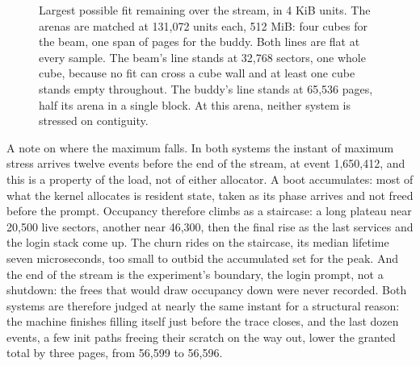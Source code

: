 \documentclass{article}
\begin{document}
\begin{figure}[H]
\centering
{}
\caption{Largest possible fit remaining over the stream, in 4 KiB units. The arenas are matched at 131,072 units each, 512 MiB: four cubes for the beam, one span of pages for the buddy. Both lines are flat at every sample. The beam's line stands at 32,768 sectors, one whole cube, because no fit can cross a cube wall and at least one cube stands empty throughout. The buddy's line stands at 65,536 pages, half its arena in a single block. At this arena, neither system is stressed on contiguity.}
\label{fig:lpfr}
\end{figure}

A note on where the maximum falls. In both systems the instant of maximum stress arrives twelve events before the end of the stream, at event 1,650,412, and this is a property of the load, not of either allocator. A boot accumulates: most of what the kernel allocates is resident state, taken as its phase arrives and not freed before the prompt. Occupancy therefore climbs as a staircase: a long plateau near 20,500 live sectors, another near 46,300, then the final rise as the last services and the login stack come up. The churn rides on the staircase, its median lifetime seven microseconds, too small to outbid the accumulated set for the peak. And the end of the stream is the experiment's boundary, the login prompt, not a shutdown: the frees that would draw occupancy down were never recorded. Both systems are therefore judged at nearly the same instant for a structural reason: the machine finishes filling itself just before the trace closes, and the last dozen events, a few init paths freeing their scratch on the way out, lower the granted total by three pages, from 56,599 to 56,596.\\
\end{document}
